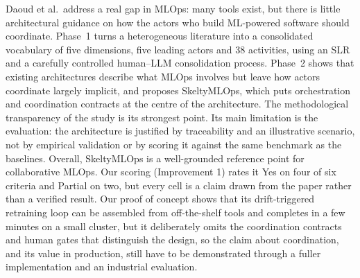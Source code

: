 \documentclass[11pt,a4paper]{article}
\begin{document}
Daoud et al.\ address a real gap in MLOps: many tools exist, but there is little architectural guidance on how the actors who build ML-powered software should coordinate. Phase~1 turns a heterogeneous literature into a consolidated vocabulary of five dimensions, five leading actors and 38 activities, using an SLR and a carefully controlled human--LLM consolidation process. Phase~2 shows that existing architectures describe what MLOps involves but leave how actors coordinate largely implicit, and proposes SkeltyMLOps, which puts orchestration and coordination contracts at the centre of the architecture. The methodological transparency of the study is its strongest point. Its main limitation is the evaluation: the architecture is justified by traceability and an illustrative scenario, not by empirical validation or by scoring it against the same benchmark as the baselines. Overall, SkeltyMLOps is a well-grounded reference point for collaborative MLOps. Our scoring (Improvement 1) rates it Yes on four of six criteria and Partial on two, but every cell is a claim drawn from the paper rather than a verified result. Our proof of concept shows that its drift-triggered retraining loop can be assembled from off-the-shelf tools and completes in a few minutes on a small cluster, but it deliberately omits the coordination contracts and human gates that distinguish the design, so the claim about coordination, and its value in production, still have to be demonstrated through a fuller implementation and an industrial evaluation.
\end{document}
